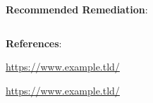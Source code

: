 \noindent
\textbf{Recommended Remediation}:
    

\begin{lstlisting}[language=bash,frame=single,showstringspaces=false]

\end{lstlisting}

    

\noindent
\textbf{References}:

    \url{https://www.example.tld/}
    
    \url{https://www.example.tld/}


